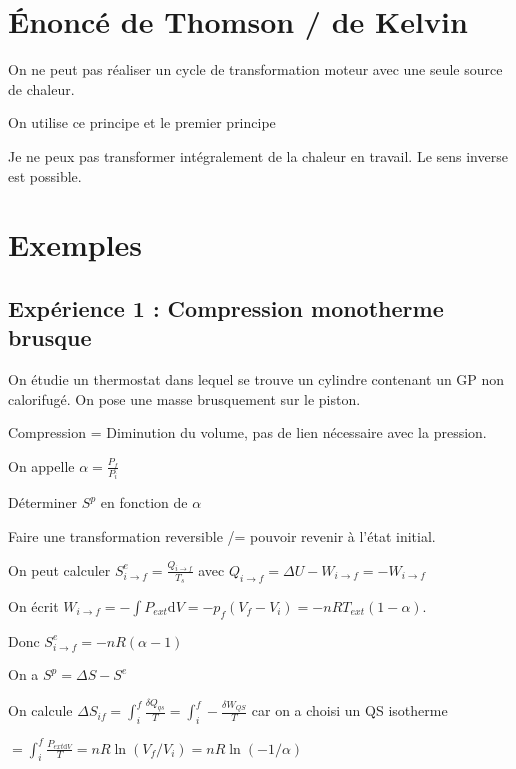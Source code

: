 \documentclass[french]{yLectureNote}
\newcommand{\dd}[0]{\mathrm{d}}
\begin{document}
\section{Énoncé de Thomson / de Kelvin}
\begin{theorem}
    On ne peut pas réaliser un cycle de transformation moteur avec une seule source de chaleur.
\end{theorem}
\begin{myproof}
    On utilise ce principe et le premier principe 
\end{myproof}
\begin{theorem}
    Je ne peux pas transformer intégralement de la chaleur en travail. Le sens inverse est possible.
\end{theorem}
\section{Exemples}
\subsection{Expérience 1 : Compression monotherme brusque}
On étudie un thermostat dans lequel se trouve un cylindre contenant un GP non calorifugé. On pose une masse brusquement sur le piston.

Compression = Diminution du volume, pas de lien nécessaire avec la pression.

On appelle $\alpha = \frac{P_f}{P_i}$

Déterminer $S^p$ en fonction de $\alpha$

Faire une transformation reversible /= pouvoir revenir à l'état initial.

On peut calculer $S^e_{i\to f} = \frac{Q_{i\to f}}{T_s}$ avec $Q_{i\to f} = \Delta U -W_{i\to f} = -W_{i\to f}$

On écrit $W_{i\to f} = -\int P_{ext} \dd V = -p_f(V_f-V_i) = -nRT_{ext}(1-\alpha)$.

Donc $S^e_{i\to f} = -nR(\alpha-1)$

On a $S^p = \Delta S - S^e$

On calcule $\Delta S_{if} = \int^f_i \frac{\delta Q_{qs}}{T} = \int_i^f -\frac{\delta W_{QS}}{T}$ car on a choisi un QS isotherme

$= \int_i^f \frac{P_{ext\dd V}}{T} = nR\ln(V_f/V_i) = nR\ln(-
1/\alpha)$
\end{document}
